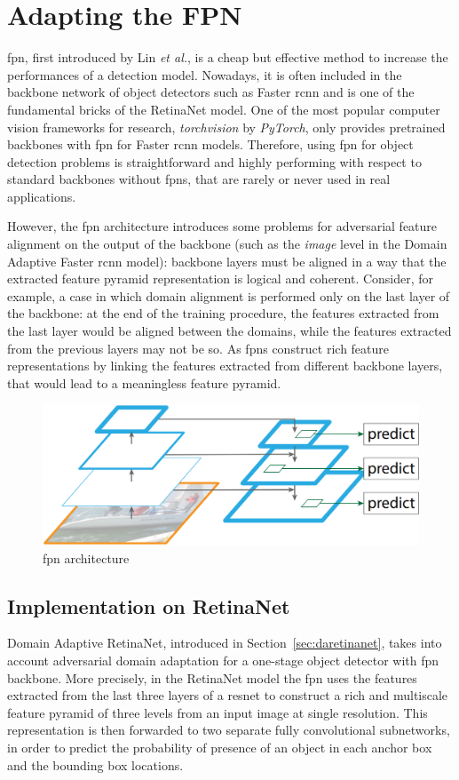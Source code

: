 \documentclass[%
    corpo=12pt,
    twoside,
    stile=classica,   
    tipotesi=magistrale,
    evenboxes,
    english,
	numerazioneromana,
]{toptesi}
\begin{document}
\section{Adapting the FPN}
\acrfull{fpn}, first introduced by Lin \textit{et al.}\cite{lin2017feature}, is a cheap but effective method to increase the performances of a detection model. Nowadays, it is often included in the backbone network of object detectors such as Faster \gls{rcnn} and is one of the fundamental bricks of the RetinaNet model. One of the most popular computer vision frameworks for research, \textit{torchvision} by \textit{PyTorch}\cite{paszke2019pytorch}, only provides pretrained backbones with \gls{fpn} for Faster \gls{rcnn} models. Therefore, using \gls{fpn} for object detection problems is straightforward and highly performing with respect to standard backbones without \glspl{fpn}, that are rarely or never used in real applications.

However, the \gls{fpn} architecture introduces some problems for adversarial feature alignment on the output of the backbone (such as the \textit{image} level in the Domain Adaptive Faster \gls{rcnn} model): backbone layers must be aligned in a way that the extracted feature pyramid representation is logical and coherent. Consider, for example, a case in which domain alignment is performed only on the last layer of the backbone: at the end of the training procedure, the features extracted from the last layer would be aligned between the domains, while the features extracted from the previous layers may not be so. As \glspl{fpn} construct rich feature representations by linking the features extracted from different backbone layers, that would lead to a meaningless feature pyramid.

\begin{figure}[ht]
	\centering
	\includegraphics[width=.6\linewidth]{imgs/fpn.png}
	\caption{\Gls{fpn} architecture\cite{chen2018domain}}
	\label{fig:fpn}
\end{figure}

\subsection{Implementation on RetinaNet}
Domain Adaptive RetinaNet, introduced in Section~\ref{sec:daretinanet}, takes into account adversarial domain adaptation for a one-stage object detector with \gls{fpn} backbone. More precisely, in the RetinaNet model the \gls{fpn} uses the features extracted from the last three layers of a \gls{resnet} to construct a rich and multiscale feature pyramid of three levels from an input image at single resolution. This representation is then forwarded to two separate fully convolutional subnetworks, in order to predict the probability of presence of an object in each anchor box and the bounding box locations.
\end{document}
